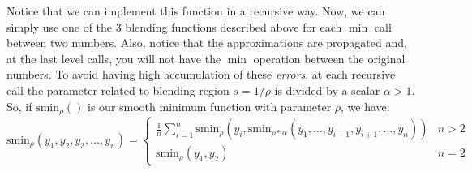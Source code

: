 \documentclass[11pt]{article}
\begin{document}
Notice that we can implement this function in a recursive way. Now, we can simply use one of the 3 blending functions described above for each $\min$ call between two numbers. Also, notice that the approximations are propagated and, at the last level calls, you will not have the $\min$ operation between the original numbers. To avoid having high accumulation of these \emph{errors}, at each recursive call the parameter related to blending region $s = 1/\rho$ is divided by a scalar $\alpha > 1$. So, if $\text{smin}_\rho()$ is our smooth minimum function with parameter $\rho$, we have:
 \[
\text{smin}_\rho(y_1, y_2, y_3, \dots, y_n) = 
\begin{cases} 
      \frac1n\sum_{i=1}^n\text{smin}_\rho(y_i, \text{smin}_{\rho*\alpha}(y_1, \dots, y_{i-1}, y_{i+1}, \dots, y_{n})) & n > 2 \\
      \text{smin}_\rho(y_1, y_2) & n = 2 
   \end{cases}
\]


 
\end{document}
